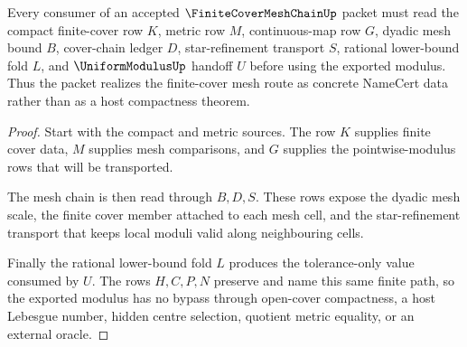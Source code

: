\begin{theorem}
\label{thm:finite-cover-mesh-chain-uniform-modulus-handoff}
Every consumer of an accepted $\FiniteCoverMeshChainUp$ packet must read the compact finite-cover row $K$, metric row $M$, continuous-map row $G$, dyadic mesh bound $B$, cover-chain ledger $D$, star-refinement transport $S$, rational lower-bound fold $L$, and $\UniformModulusUp$ handoff $U$ before using the exported modulus. Thus the packet realizes the finite-cover mesh route as concrete NameCert data rather than as a host compactness theorem.
\end{theorem}
\begin{proof}
Start with the compact and metric sources. The row $K$ supplies finite cover data, $M$ supplies mesh comparisons, and $G$ supplies the pointwise-modulus rows that will be transported.

The mesh chain is then read through $B,D,S$. These rows expose the dyadic mesh scale, the finite cover member attached to each mesh cell, and the star-refinement transport that keeps local moduli valid along neighbouring cells.

Finally the rational lower-bound fold $L$ produces the tolerance-only value consumed by $U$. The rows $H,C,P,N$ preserve and name this same finite path, so the exported modulus has no bypass through open-cover compactness, a host Lebesgue number, hidden centre selection, quotient metric equality, or an external oracle.
\end{proof}



